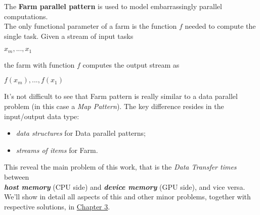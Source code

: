 	The \textbf{Farm parallel pattern} is used to model embarrassingly parallel computations. \\The only functional parameter of a farm is the function \(f\) needed to compute the single task.
	Given a stream of input tasks \cite{spm}
	\begin{center}
		\(x_m , . . . , x_1\)\\
	\end{center}
	the farm with function \(f\) computes the output stream as
	\begin{center}
		\(f ( x_m ), . . . , f ( x_1 )\)
	\end{center}
			
	It's not difficult to see that Farm pattern is really similar to a data parallel problem (in this case a \textit{Map Pattern}). The key difference resides in the input/output data type:
	\begin{itemize}			
		\item \textit{data structures} for Data parallel patterns;
		\item \textit{streams of items} for Farm.
	\end{itemize}
	
	This reveal the main problem of this work, that is the \textit{Data Transfer times} between\\ \textit{\textbf{host memory}} (CPU side) and \textit{\textbf{device memory}} (GPU side), and vice versa.\\ We'll show in detail all aspects of this and other minor problems, together with respective solutions, in \hyperref[chap:logic]{Chapter 3}.

